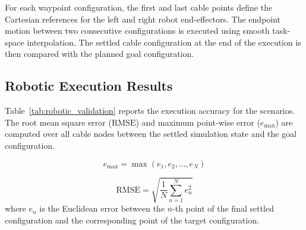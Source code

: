 \documentclass{pas}
\begin{document}
For each waypoint configuration, the first and last cable points define the Cartesian references for the left and right robot end-effectors.
The endpoint motion between two consecutive configurations is executed using smooth task-space interpolation.
The settled cable configuration at the end of the execution is then compared with the planned goal configuration.

\subsection{Robotic Execution Results}
\label{subsec:robotic_results}

Table~\ref{tab:robotic_validation} reports the execution accuracy for the scenarios. The root mean square error (\(\mathrm{RMSE}\)) and maximum point-wise error (\(e_{\max}\)) are computed over all cable nodes between the settled simulation state and the goal configuration.

\begin{equation}
    e_{\max} = \max(e_1, e_2, \dots, e_N)
\end{equation}

\begin{equation}
    \mathrm{RMSE} = \sqrt{\frac{1}{N}\sum_{n=1}^{N} e_n^2}
\end{equation}
where $e_n$ is the Euclidean error between the $n$-th point of the final settled configuration and the corresponding point of the target configuration.

\end{document}
